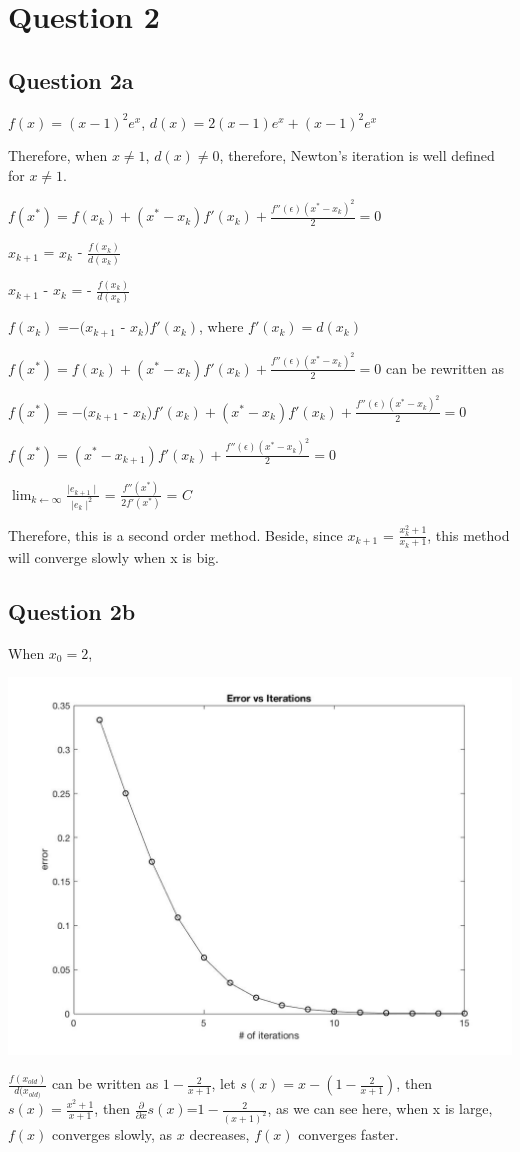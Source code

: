 \documentclass[11pt]{article} %
\begin{document}
\section{Question 2}
\subsection{Question 2a}
\centerline{$f(x) = (x-1)^{2}e^{x}$, $d(x) = 2(x-1)e^{x}+(x-1)^{2}e^{x}$}
Therefore, when $x\neq1$, $d(x)\neq0$, therefore, Newton's iteration is well defined for $x\neq1$. \medskip

\centerline{$f(x^{*}) = f(x_{k})+(x^{*}-x_{k})f'(x_{k})+\frac{f''(\epsilon)(x^{*}-x_{k})^{2}}{2} = 0$}
\centerline{$x_{k+1}$ =  $x_{k}$ - $\frac{f(x_{k})}{d(x_{k})}$}
\centerline{$x_{k+1}$ - $x_{k}$ = - $\frac{f(x_{k})}{d(x_{k})}$}
\centerline{$f(x_{k})$ =$-(x_{k+1}$ - $x_{k})f'(x_{k})$, where $f'(x_{k}) = d(x_{k})$}
\centerline{$f(x^{*}) = f(x_{k})+(x^{*}-x_{k})f'(x_{k})+\frac{f''(\epsilon)(x^{*}-x_{k})^{2}}{2} = 0$ can be rewritten as}
\centerline{$f(x^{*}) = -(x_{k+1}$ - $x_{k})f'(x_{k}) + (x^{*}-x_{k})f'(x_{k})+\frac{f''(\epsilon)(x^{*}-x_{k})^{2}}{2} = 0$}
\centerline{$f(x^{*}) = (x^{*}-x_{k+1})f'(x_{k})+\frac{f''(\epsilon)(x^{*}-x_{k})^{2}}{2} = 0$}
\centerline{$\lim_{k\gets\infty}\frac{\mid e_{k+1}\mid}{\mid e_{k}\mid^{2}}$ = $\frac{f''(x^{*})}{2f'(x^{*})}$ = $C$}
Therefore, this is a second order method.\medskip
Beside, since $x_{k+1}$ = $\frac{x_{k}^{2}+1}{x_{k}+1}$, this method will converge slowly when x is big.
\subsection{Question 2b}
When $x_{0} = 2$,
\begin{center}
\includegraphics[scale = 0.35]{q22.jpg}\\\medskip
\end{center}
$\frac{f(x_{old})}{d(x_{old)}}$ can be written as $1-\frac{2}{x+1}$, let $s(x) = x - (1-\frac{2}{x+1})$, then $s(x) = \frac{x^{2}+1}{x+1}$, then $\frac{\partial}{\partial x}s(x)$=$1-\frac{2}{(x+1)^{2}}$, as we can see here, when x is large, $f(x)$ converges slowly, as $x$ decreases, $f(x)$ converges faster. 
\end{document}
